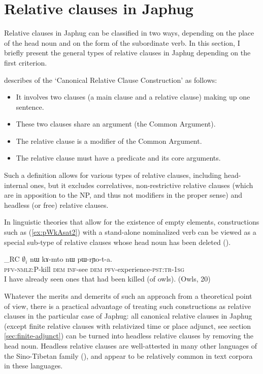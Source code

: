 \documentclass[oldfontcommands,oneside,a4paper,11pt]{article}
\newcommand{\ipa}[1]{{\phon #1}} %
\newcommand{\topic}{\textsc{dem}}
\newcommand{\refb}[1]{(\ref{#1})}
\begin{document}
\section{Relative clauses in Japhug}
Relative clauses in Japhug can be classified in two ways, depending on the place of the head noun and on the form of the subordinate verb. In this section, I briefly present  the general types of relative clauses in Japhug depending on the first criterion.  

 \citet[314]{dixon10basic2}  describes of the `Canonical Relative Clause Construction' as follows:
 
\begin{itemize}
\item It involves two clauses (a main clause and a relative clause) making up one sentence. 
\item These two clauses share an argument (the Common Argument). 
\item The relative clause is a modifier of the Common Argument. 
\item The relative clause must have a predicate and its core arguments. 
\end{itemize}
 
Such a definition allows for various types of relative clauses, including head-internal ones, but it excludes correlatives, non-restrictive relative clauses (which are in apposition to the NP, and thus not modifiers in the proper sense) and headless (or free) relative clauses.

In linguistic theories that  allow for the existence of empty elements, constructions such as \refb{ex:pWkAsat2} with a stand-alone nominalized verb can be viewed as a special sub-type of relative clauses whose head noun has been deleted (\citealt[197-205]{dryer07noun.phrase}). 


   \begin{exe}
\ex \label{ex:pWkAsat2}
\gll [$\emptyset_i$ \ipa{pɯ-kɤ-sat}]_{RC}  $\emptyset_i$ 	\ipa{nɯ}  	\ipa{kɤ-mto}  	\ipa{nɯ}  	\ipa{pɯ-rɲo-t-a.}  \\
{ }  \textsc{pfv-nmlz:P}-kill { } \topic{} \textsc{inf}-see \topic{} \textsc{pfv}-experience-\textsc{pst:tr-1sg} \\
\glt I have already seen ones that had been killed (of owls). (Owls, 20)
  \end{exe}

Whatever the merits and demerits of such an approach from a theoretical point of view, there is a practical advantage of treating such constructions as relative clauses in the particular case of Japhug: all canonical relative clauses in Japhug (except  finite relative clauses with relativized time or place adjunct, see section \ref{sec:finite-adjunct}) can be turned into headless relative clauses by removing the head noun. Headless relative clauses are well-attested in many other languages of the Sino-Tibetan family (\citealt[128-9]{genetti08nmlz}), and appear to be relatively common in text corpora in these languages.
\end{document}
